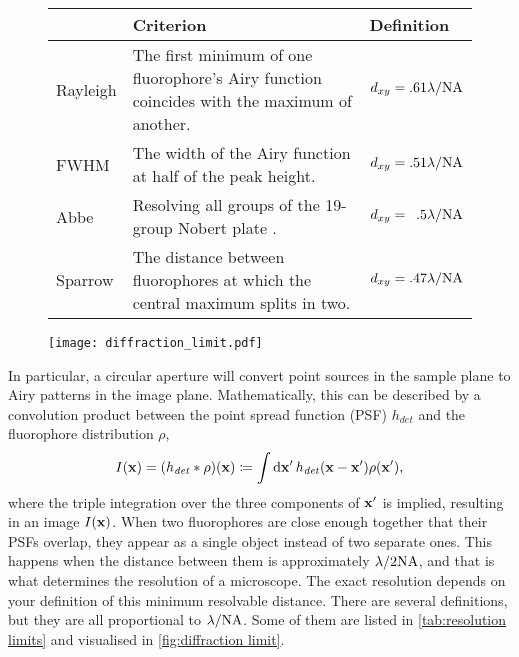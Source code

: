 \begin{figure}[!t]
	\centering
	\begin{tabularx}{\linewidth}{lXl}
		\toprule
		         & Criterion                                                                                   & Definition                            \\ \midrule
		Rayleigh & The first minimum of one fluorophore's Airy function coincides with the maximum of another. & $ d_{xy} = .61\lambda/\mathrm{NA} $           \\
		FWHM     & The width of the Airy function at half of the peak height.                                  & $ d_{xy} = .51\lambda/\mathrm{NA} $           \\
		Abbe     & Resolving all groups of the 19-group Nobert plate \cite{Abbe1873, Norbert}.                 & $ d_{xy} = \phantom{1}.5\lambda/\mathrm{NA} $ \\
		Sparrow  & The distance between fluorophores at which the central maximum splits in two.               & $ d_{xy} = .47 \lambda/\mathrm{NA} $          \\ \bottomrule
	\end{tabularx}
	\label{tab:resolution limits}
	
	\centering
	\texttt{[image: diffraction\_limit.pdf]}
	\label{fig:diffraction limit}
\end{figure}

In particular, a circular aperture will convert point sources in the sample plane to Airy patterns in the image plane. Mathematically, this can be described by a convolution product between the point spread function (PSF) $ h_\mathit{det} $ and the fluorophore distribution $ \rho $,
\begin{equation}
	I(\vb{x}) = (h_\mathit{det} * \rho)(\vb{x}) \coloneqq \int\dd{\vb{x}'} h_\mathit{det}(\vb{x}-\vb{x}')\rho(\vb{x}'),
	\label{eq:convolution}
\end{equation}
where the triple integration over the three components of $ \vb{x}' $ is implied, resulting in an image $ I(\vb{x}) $. When two fluorophores are close enough together that their PSFs overlap, they appear as a single object instead of two separate ones. This happens when the distance between them is approximately $ \lambda/2\mathrm{NA} $, and that is what determines the resolution of a microscope. The exact resolution depends on your definition of this minimum resolvable distance. There are several definitions, but they are all proportional to $ \lambda/\mathrm{NA} $. Some of them are listed in \autoref{tab:resolution limits} and visualised in \autoref{fig:diffraction limit}.



